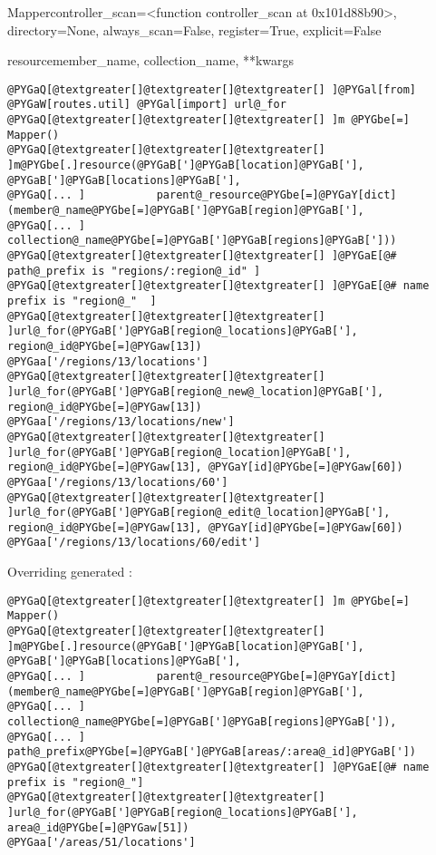 \documentclass[letterpaper,10pt,english]{manual}
\begin{document}
\begin{classdesc}{Mapper}{controller\_scan=\textless{}function controller\_scan at 0x101d88b90\textgreater{}, directory=None, always\_scan=False, register=True, explicit=False}
\begin{methoddesc}{resource}{member\_name, collection\_name, **kwargs}
\begin{description}
\begin{Verbatim}[commandchars=@\[\]]
@PYGaQ[@textgreater[]@textgreater[]@textgreater[] ]@PYGal[from] @PYGaW[routes.util] @PYGal[import] url@_for 
@PYGaQ[@textgreater[]@textgreater[]@textgreater[] ]m @PYGbe[=] Mapper() 
@PYGaQ[@textgreater[]@textgreater[]@textgreater[] ]m@PYGbe[.]resource(@PYGaB[']@PYGaB[location]@PYGaB['], @PYGaB[']@PYGaB[locations]@PYGaB['], 
@PYGaQ[... ]           parent@_resource@PYGbe[=]@PYGaY[dict](member@_name@PYGbe[=]@PYGaB[']@PYGaB[region]@PYGaB['], 
@PYGaQ[... ]                                collection@_name@PYGbe[=]@PYGaB[']@PYGaB[regions]@PYGaB[']))
@PYGaQ[@textgreater[]@textgreater[]@textgreater[] ]@PYGaE[@# path@_prefix is "regions/:region@_id" ]
@PYGaQ[@textgreater[]@textgreater[]@textgreater[] ]@PYGaE[@# name prefix is "region@_"  ]
@PYGaQ[@textgreater[]@textgreater[]@textgreater[] ]url@_for(@PYGaB[']@PYGaB[region@_locations]@PYGaB['], region@_id@PYGbe[=]@PYGaw[13]) 
@PYGaa['/regions/13/locations']
@PYGaQ[@textgreater[]@textgreater[]@textgreater[] ]url@_for(@PYGaB[']@PYGaB[region@_new@_location]@PYGaB['], region@_id@PYGbe[=]@PYGaw[13]) 
@PYGaa['/regions/13/locations/new']
@PYGaQ[@textgreater[]@textgreater[]@textgreater[] ]url@_for(@PYGaB[']@PYGaB[region@_location]@PYGaB['], region@_id@PYGbe[=]@PYGaw[13], @PYGaY[id]@PYGbe[=]@PYGaw[60]) 
@PYGaa['/regions/13/locations/60']
@PYGaQ[@textgreater[]@textgreater[]@textgreater[] ]url@_for(@PYGaB[']@PYGaB[region@_edit@_location]@PYGaB['], region@_id@PYGbe[=]@PYGaw[13], @PYGaY[id]@PYGbe[=]@PYGaw[60]) 
@PYGaa['/regions/13/locations/60/edit']
\end{Verbatim}

Overriding generated :

\begin{Verbatim}[commandchars=@\[\]]
@PYGaQ[@textgreater[]@textgreater[]@textgreater[] ]m @PYGbe[=] Mapper()
@PYGaQ[@textgreater[]@textgreater[]@textgreater[] ]m@PYGbe[.]resource(@PYGaB[']@PYGaB[location]@PYGaB['], @PYGaB[']@PYGaB[locations]@PYGaB['],
@PYGaQ[... ]           parent@_resource@PYGbe[=]@PYGaY[dict](member@_name@PYGbe[=]@PYGaB[']@PYGaB[region]@PYGaB['],
@PYGaQ[... ]                                collection@_name@PYGbe[=]@PYGaB[']@PYGaB[regions]@PYGaB[']),
@PYGaQ[... ]           path@_prefix@PYGbe[=]@PYGaB[']@PYGaB[areas/:area@_id]@PYGaB['])
@PYGaQ[@textgreater[]@textgreater[]@textgreater[] ]@PYGaE[@# name prefix is "region@_"]
@PYGaQ[@textgreater[]@textgreater[]@textgreater[] ]url@_for(@PYGaB[']@PYGaB[region@_locations]@PYGaB['], area@_id@PYGbe[=]@PYGaw[51])
@PYGaa['/areas/51/locations']
\end{Verbatim}


\end{description}
\end{methoddesc}
\end{classdesc}
\end{document}
